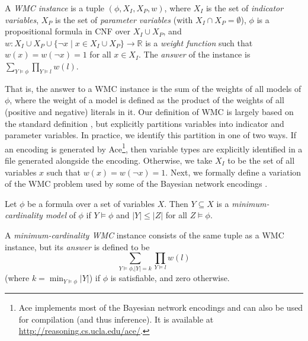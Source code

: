 \begin{definition}[WMC]\label{def:wmc}
  A \emph{WMC instance} is a tuple $(\phi, X_I, X_P, w)$, where $X_I$ is
  the set of \emph{indicator variables}, $X_P$ is the set of \emph{parameter
  variables} (with $X_I \cap X_P = \emptyset$), $\phi$ is a propositional formula
  in CNF over $X_I \cup X_P$, and $w\colon X_I \cup X_P \cup \{\neg x \mid x \in
  X_I \cup X_P\} \to \mathbb{R}$ is a \emph{weight function} such that $w(x) =
  w(\neg x) = 1$ for all $x \in X_I$. The \emph{answer} of the instance is
  $\sum_{Y \models \phi} \prod_{Y \models l} w(l)$.
\end{definition}

That is, the answer to a WMC instance is the sum of the weights of all models of
$\phi$, where the weight of a model is defined as the product of the weights of
all (positive and negative) literals in it. Our definition of WMC is largely
based on the standard definition \citep{DBLP:journals/ai/ChaviraD08}, but
explicitly partitions variables into indicator and parameter variables. In
practice, we identify this partition in one of two ways. If an encoding is
generated by \textsf{Ace}\footnote{\textsf{Ace}
  \citep{DBLP:journals/ai/ChaviraD08} implements most of the Bayesian network
  encodings and can also be used for compilation (and thus inference). It is
  available at \url{http://reasoning.cs.ucla.edu/ace/}.}, then variable types
are explicitly identified in a file generated alongside the encoding. Otherwise,
we take $X_I$ to be the set of all variables $x$ such that $w(x) = w(\neg x) =
1$. Next, we formally define a variation of the WMC problem used by some of the
Bayesian network encodings
\citep{DBLP:conf/ijcai/ChaviraD05,DBLP:conf/sat/ChaviraD06}.

\begin{definition}
  Let $\phi$ be a formula over a set of variables $X$. Then $Y \subseteq X$ is a
  \emph{minimum-cardinality model} of $\phi$ if $Y \models \phi$ and $|Y| \le
  |Z|$ for all $Z \models \phi$.
\end{definition}

\begin{definition}\label{def:mcwmc}
  A \emph{minimum-cardinality WMC} instance consists of the same tuple as a WMC
  instance, but its \emph{answer} is defined to be
  \[
  \sum_{Y \models \phi\text{,}|Y| = k} \prod_{Y \models l} w(l)
  \]
  (where $k = \min_{Y \models \phi} |Y|$) if $\phi$ is satisfiable, and zero otherwise.
\end{definition}

